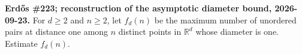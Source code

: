 \textbf{Erd\H{o}s \#223; reconstruction of the asymptotic diameter bound, 2026-09-23.}
For $d\geq2$ and $n\geq2$, let $f_d(n)$ be the maximum number of unordered pairs at distance one among $n$ distinct points in $\mathbb R^d$ whose diameter is one. Estimate $f_d(n)$.
